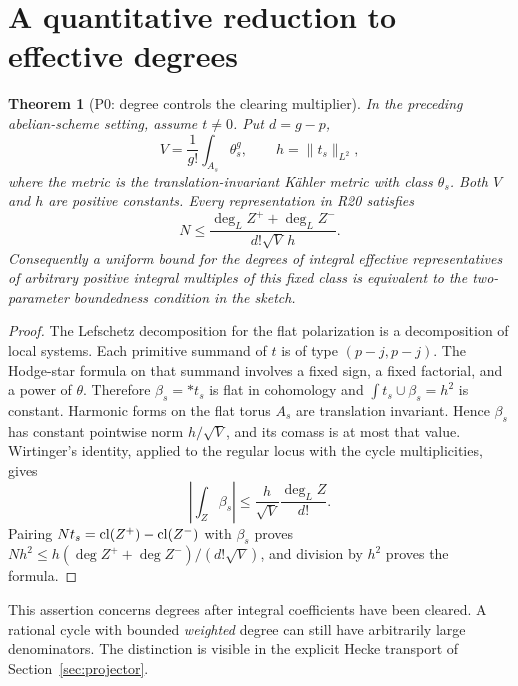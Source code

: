 \documentclass[11pt,a4paper]{article}
\newtheorem{theorem}{Theorem}[section]
\theoremstyle{definition}\newtheorem{definition}[theorem]{Definition}
\theoremstyle{remark}\newtheorem{remark}[theorem]{Remark}
\begin{document}
\section{A quantitative reduction to effective degrees}
\begin{theorem}[P0: degree controls the clearing multiplier]\label{P0}
In the preceding abelian-scheme setting, assume $t\ne0$. Put $d=g-p$,
\[
 V=\frac{1}{g!}\int_{A_s}\theta_s^g,
 \qquad h=\|t_s\|_{L^2},
\]
where the metric is the translation-invariant K\"ahler metric with class $\theta_s$. Both $V$ and $h$ are positive constants. Every representation in R20 satisfies
\begin{equation}\label{eq:Nbound}
 N\le \frac{\deg_L Z^++\deg_L Z^-}{d!\sqrt V\,h}.
\end{equation}
Consequently a uniform bound for the degrees of integral effective representatives of arbitrary positive integral multiples of this fixed class is equivalent to the two-parameter boundedness condition in the sketch.
\end{theorem}
\begin{proof}
The Lefschetz decomposition for the flat polarization is a decomposition of local systems. Each primitive summand of $t$ is of type $(p-j,p-j)$. The Hodge-star formula on that summand involves a fixed sign, a fixed factorial, and a power of $\theta$. Therefore $\beta_s=*t_s$ is flat in cohomology and
$\int t_s\cup\beta_s=h^2$ is constant. Harmonic forms on the flat torus $A_s$ are translation invariant. Hence $\beta_s$ has constant pointwise norm $h/\sqrt V$, and its comass is at most that value. Wirtinger's identity, applied to the regular locus with the cycle multiplicities, gives
\[
 \left|\int_Z\beta_s\right|
 \le \frac{h}{\sqrt V}\frac{\deg_L Z}{d!}.
\]
Pairing $Nt_s=\operatorname{cl}(Z^+)-\operatorname{cl}(Z^-)$ with $\beta_s$ proves
$Nh^2\le h(\deg Z^++\deg Z^-)/(d!\sqrt V)$, and division by $h^2$ proves the formula.
\end{proof}

This assertion concerns degrees after integral coefficients have been cleared. A rational cycle with bounded \emph{weighted} degree can still have arbitrarily large denominators. The distinction is visible in the explicit Hecke transport of Section~\ref{sec:projector}.
\end{document}
